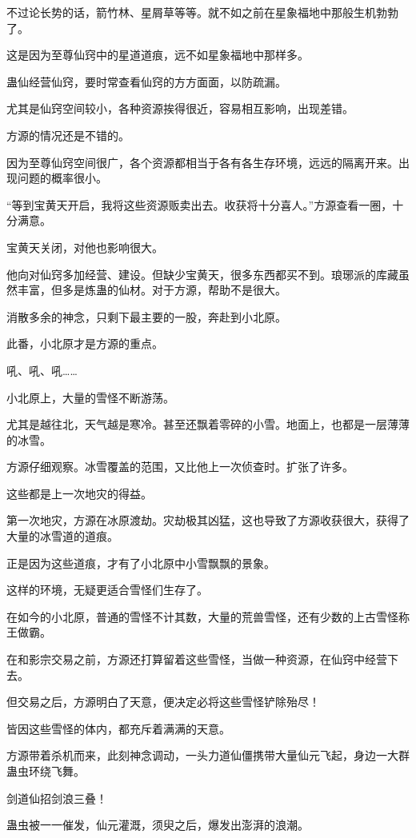 \begin{this_body}
不过论长势的话，箭竹林、星屑草等等。就不如之前在星象福地中那般生机勃勃了。

这是因为至尊仙窍中的星道道痕，远不如星象福地中那样多。

蛊仙经营仙窍，要时常查看仙窍的方方面面，以防疏漏。

尤其是仙窍空间较小，各种资源挨得很近，容易相互影响，出现差错。

方源的情况还是不错的。

因为至尊仙窍空间很广，各个资源都相当于各有各生存环境，远远的隔离开来。出现问题的概率很小。

“等到宝黄天开启，我将这些资源贩卖出去。收获将十分喜人。”方源查看一圈，十分满意。

宝黄天关闭，对他也影响很大。

他向对仙窍多加经营、建设。但缺少宝黄天，很多东西都买不到。琅琊派的库藏虽然丰富，但多是炼蛊的仙材。对于方源，帮助不是很大。

消散多余的神念，只剩下最主要的一股，奔赴到小北原。

此番，小北原才是方源的重点。

吼、吼、吼……

小北原上，大量的雪怪不断游荡。

尤其是越往北，天气越是寒冷。甚至还飘着零碎的小雪。地面上，也都是一层薄薄的冰雪。

方源仔细观察。冰雪覆盖的范围，又比他上一次侦查时。扩张了许多。

这些都是上一次地灾的得益。

第一次地灾，方源在冰原渡劫。灾劫极其凶猛，这也导致了方源收获很大，获得了大量的冰雪道的道痕。

正是因为这些道痕，才有了小北原中小雪飘飘的景象。

这样的环境，无疑更适合雪怪们生存了。

在如今的小北原，普通的雪怪不计其数，大量的荒兽雪怪，还有少数的上古雪怪称王做霸。

在和影宗交易之前，方源还打算留着这些雪怪，当做一种资源，在仙窍中经营下去。

但交易之后，方源明白了天意，便决定必将这些雪怪铲除殆尽！

皆因这些雪怪的体内，都充斥着满满的天意。

方源带着杀机而来，此刻神念调动，一头力道仙僵携带大量仙元飞起，身边一大群蛊虫环绕飞舞。

剑道仙招剑浪三叠！

蛊虫被一一催发，仙元灌溉，须臾之后，爆发出澎湃的浪潮。


\end{this_body}
